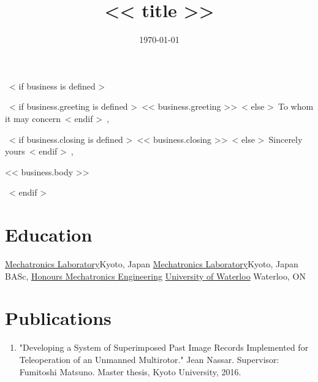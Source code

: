 \documentclass[10pt]{moderncv}
\title{<< title >>}
\begin{document}
~< if business is defined >~
\date{\today}
\opening{~< if business.greeting is defined >~<< business.greeting >>~< else >~To whom it may concern~< endif >~,}
\closing{~< if business.closing is defined >~<< business.closing >>~< else >~Sincerely yours~< endif >~,}

\makelettertitle            %
<< business.body >>

\makeletterclosing          %
\newpage
\setcounter{page}{1}
~< endif >~


\makecvtitle


\section{Education}
%
    {\href{www.mechatronics.me.kyoto-u.ac.jp}{Mechatronics Laboratory}}{Kyoto, Japan}{}
%
    {\href{www.mechatronics.me.kyoto-u.ac.jp}{Mechatronics Laboratory}}{Kyoto, Japan}{}
%
    {BASc, \href{https://uwaterloo.ca/mechanical-mechatronics-engineering/program-overview}{Honours Mechatronics Engineering}}%
    {\href{http://www.uwaterloo.ca}{University of Waterloo}}%
    {}{Waterloo, ON}{}

\section{Publications}
\begin{enumerate}
\item "Developing a System of Superimposed Past Image Records Implemented for Teleoperation of an Unmanned Multirotor."%
    Jean Nassar. Supervisor: Fumitoshi Matsuno. Master thesis, Kyoto University, 2016.
\end{enumerate}
\end{document}
